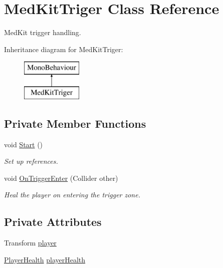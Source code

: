 \hypertarget{class_med_kit_triger}{}\section{Med\+Kit\+Triger Class Reference}
\label{class_med_kit_triger}


Med\+Kit trigger handling.  


Inheritance diagram for Med\+Kit\+Triger\+:\begin{figure}[H]
\begin{center}
\leavevmode
\includegraphics[height=2.000000cm]{class_med_kit_triger}
\end{center}
\end{figure}
\subsection*{Private Member Functions}
\begin{DoxyCompactItemize}
\item 
void \mbox{\hyperlink{class_med_kit_triger_a03597c257a8c3ee404a4e356db780b0e}{Start}} ()
\begin{DoxyCompactList}\small\item\em Set up references. \end{DoxyCompactList}\item 
void \mbox{\hyperlink{class_med_kit_triger_ab638fdcd755f734f6058975f651b628a}{On\+Trigger\+Enter}} (Collider other)
\begin{DoxyCompactList}\small\item\em Heal the player on entering the trigger zone. \end{DoxyCompactList}\end{DoxyCompactItemize}
\subsection*{Private Attributes}
\begin{DoxyCompactItemize}
\item 
Transform \mbox{\hyperlink{class_med_kit_triger_aabb6415626ac4c6aef5d820442aa219a}{player}}
\item 
\mbox{\hyperlink{class_player_health}{Player\+Health}} \mbox{\hyperlink{class_med_kit_triger_ac21e65fa7cf7d7d83f13289a58177c22}{player\+Health}}
\end{DoxyCompactItemize}


